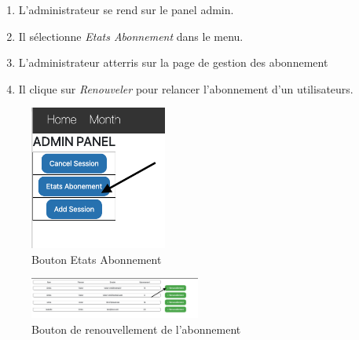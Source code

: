 \begin{enumerate}
	\item L'administrateur se rend sur le panel admin. 
	\item Il sélectionne \textit{Etats Abonnement} dans le menu. 
	\item L'administrateur atterris sur la page de gestion des abonnement 
	\item Il clique sur \textit{Renouveler} pour relancer l'abonnement d'un utilisateurs. 
\end{enumerate}

\begin{figure}[h]
	\includegraphics[width=0.4\textwidth,center]{Figures/us11-1}
	\caption{Bouton Etats Abonnement}
\end{figure}

\vspace{\baselineskip}
\vspace{\baselineskip}
\begin{figure}[h]
	\includegraphics[width=0.5\textwidth,center]{Figures/us11-2}
	\caption{Bouton de renouvellement de l'abonnement}
\end{figure}
